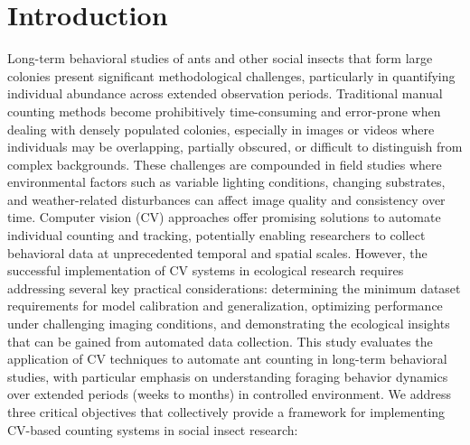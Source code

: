 \section{Introduction}

Long-term behavioral studies of ants and other social insects that form large colonies present significant methodological challenges, particularly in quantifying individual abundance across extended observation periods. Traditional manual counting methods become prohibitively time-consuming and error-prone when dealing with densely populated colonies, especially in images or videos where individuals may be overlapping, partially obscured, or difficult to distinguish from complex backgrounds. These challenges are compounded in field studies where environmental factors such as variable lighting conditions, changing substrates, and weather-related disturbances can affect image quality and consistency over time.
Computer vision (CV) approaches offer promising solutions to automate individual counting and tracking, potentially enabling researchers to collect behavioral data at unprecedented temporal and spatial scales. However, the successful implementation of CV systems in ecological research requires addressing several key practical considerations: determining the minimum dataset requirements for model calibration and generalization, optimizing performance under challenging imaging conditions, and demonstrating the ecological insights that can be gained from automated data collection.
This study evaluates the application of CV techniques to automate ant counting in long-term behavioral studies, with particular emphasis on understanding foraging behavior dynamics over extended periods (weeks to months) in controlled environment. We address three critical objectives that collectively provide a framework for implementing CV-based counting systems in social insect research:

